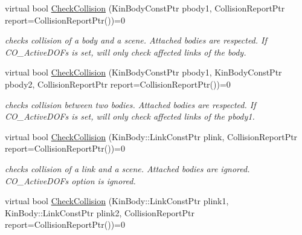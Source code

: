 \label{classOpenRAVE_1_1CollisionCheckerBase_collision_checking}
\hypertarget{classOpenRAVE_1_1CollisionCheckerBase_collision_checking}{}
 \begin{DoxyCompactItemize}
\item 
\hypertarget{classOpenRAVE_1_1CollisionCheckerBase_a032bda10dc517c50606781511da243d3}{
virtual bool \hyperlink{classOpenRAVE_1_1CollisionCheckerBase_a032bda10dc517c50606781511da243d3}{CheckCollision} (KinBodyConstPtr pbody1, CollisionReportPtr report=CollisionReportPtr())=0}
\label{classOpenRAVE_1_1CollisionCheckerBase_a032bda10dc517c50606781511da243d3}

\begin{DoxyCompactList}\small\item\em checks collision of a body and a scene. Attached bodies are respected. If CO\_\-ActiveDOFs is set, will only check affected links of the body. \item\end{DoxyCompactList}\item 
\hypertarget{classOpenRAVE_1_1CollisionCheckerBase_ab286174aabc8a0e8b090b25963a531b3}{
virtual bool \hyperlink{classOpenRAVE_1_1CollisionCheckerBase_ab286174aabc8a0e8b090b25963a531b3}{CheckCollision} (KinBodyConstPtr pbody1, KinBodyConstPtr pbody2, CollisionReportPtr report=CollisionReportPtr())=0}
\label{classOpenRAVE_1_1CollisionCheckerBase_ab286174aabc8a0e8b090b25963a531b3}

\begin{DoxyCompactList}\small\item\em checks collision between two bodies. Attached bodies are respected. If CO\_\-ActiveDOFs is set, will only check affected links of the pbody1. \item\end{DoxyCompactList}\item 
\hypertarget{classOpenRAVE_1_1CollisionCheckerBase_ac4d2da56daf4dbd95074bf2dd72974a9}{
virtual bool \hyperlink{classOpenRAVE_1_1CollisionCheckerBase_ac4d2da56daf4dbd95074bf2dd72974a9}{CheckCollision} (KinBody::LinkConstPtr plink, CollisionReportPtr report=CollisionReportPtr())=0}
\label{classOpenRAVE_1_1CollisionCheckerBase_ac4d2da56daf4dbd95074bf2dd72974a9}

\begin{DoxyCompactList}\small\item\em checks collision of a link and a scene. Attached bodies are ignored. CO\_\-ActiveDOFs option is ignored. \item\end{DoxyCompactList}\item 
\hypertarget{classOpenRAVE_1_1CollisionCheckerBase_abc391362f1952f15cd5a27fdd9b8a65d}{
virtual bool \hyperlink{classOpenRAVE_1_1CollisionCheckerBase_abc391362f1952f15cd5a27fdd9b8a65d}{CheckCollision} (KinBody::LinkConstPtr plink1, KinBody::LinkConstPtr plink2, CollisionReportPtr report=CollisionReportPtr())=0}
\label{classOpenRAVE_1_1CollisionCheckerBase_abc391362f1952f15cd5a27fdd9b8a65d}


\end{DoxyCompactItemize}
